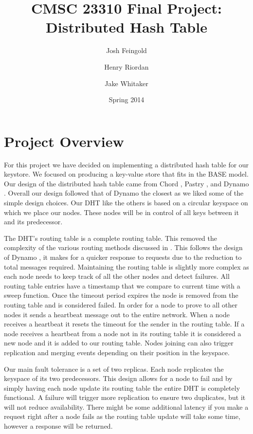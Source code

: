\documentclass[11pt]{article}
\title{CMSC 23310 Final Project:\\
Distributed Hash Table}
\author{Josh Feingold \and Henry Riordan \and Jake Whitaker}
\date{Spring 2014}
\begin{document}
\maketitle

\section{Project Overview}\label{sec:overview}

For this project we have decided on implementing a distributed hash table for our keystore. We focused on producing a key-value store that fits in the BASE model.\cite{Fox_1997_BASE} Our design of the distributed hash table came from Chord \cite{Stoica_2003_Chord}, Pastry \cite{Rowstron_2001_Pastry}, and Dynamo \cite{DeCandia_2007_Dynamo}. Overall our design followed that of Dynamo the closest as we liked some of the simple design choices. Our DHT like the others is based on a circular keyspace on which we place our nodes. These nodes will be in control of all keys between it and its predecessor. 

The DHT's routing table is a complete routing table. This removed the complexity of the various routing methods discussed in \cite{Stoica_2003_Chord, Rowstron_2001_Pastry}. This follows the design of Dynamo \cite{DeCandia_2007_Dynamo}, it makes for a quicker response to requests due to the reduction to total messages required. Maintaining the routing table is slightly more complex as each node needs to keep track of all the other nodes and detect failures. All routing table entries have a timestamp that we compare to current time with a sweep function. Once the timeout period expires the node is removed from the routing table and is considered failed.  In order for a node to prove to all other nodes it sends a heartbeat message out to the entire network. When a node receives a heartbeat it resets the timeout for the sender in the routing table. If a node receives a heartbeat from a node not in its routing table it is considered a new node and it is added to our routing table. Nodes joining can also trigger replication and merging events depending on their position in the keyspace.

Our main fault tolerance is a set of two replicas. Each node replicates the keyspace of its two predecessors. This design allows for a node to fail and by simply having each node update its routing table the entire DHT is completely functional. A failure will trigger more replication to ensure two duplicates, but it will not reduce availability. There might be some additional latency if you make a request right after a node fails as the routing table update will take some time, however a response will be returned.
\end{document}
